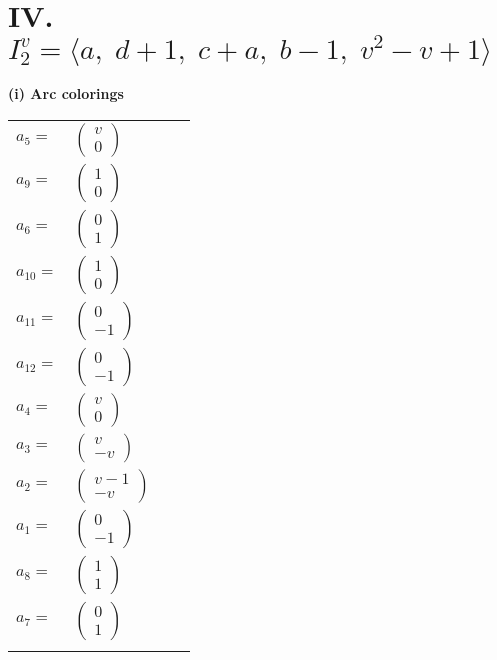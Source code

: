 \documentclass[1p]{elsarticle_modified}
\theoremstyle{definition}
\begin{document}
\centering \section*{IV. $I^v_{2}= \langle a,\;d+1,\;c+a,\;b-1,\;v^2- v+1 \rangle$}
\flushleft \textbf{(i) Arc colorings}\\
\begin{tabular}{m{7pt} m{180pt} m{7pt} m{180pt} }
\flushright $a_{5}=$&$\begin{pmatrix}v\\0\end{pmatrix}$ \\
\flushright $a_{9}=$&$\begin{pmatrix}1\\0\end{pmatrix}$ \\
\flushright $a_{6}=$&$\begin{pmatrix}0\\1\end{pmatrix}$ \\
\flushright $a_{10}=$&$\begin{pmatrix}1\\0\end{pmatrix}$ \\
\flushright $a_{11}=$&$\begin{pmatrix}0\\-1\end{pmatrix}$ \\
\flushright $a_{12}=$&$\begin{pmatrix}0\\-1\end{pmatrix}$ \\
\flushright $a_{4}=$&$\begin{pmatrix}v\\0\end{pmatrix}$ \\
\flushright $a_{3}=$&$\begin{pmatrix}v\\- v\end{pmatrix}$ \\
\flushright $a_{2}=$&$\begin{pmatrix}v-1\\- v\end{pmatrix}$ \\
\flushright $a_{1}=$&$\begin{pmatrix}0\\-1\end{pmatrix}$ \\
\flushright $a_{8}=$&$\begin{pmatrix}1\\1\end{pmatrix}$ \\
\flushright $a_{7}=$&$\begin{pmatrix}0\\1\end{pmatrix}$\\&\end{tabular}
\end{document}
